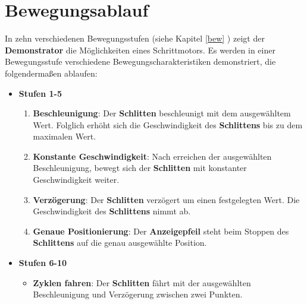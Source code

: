 
\chapter{Bewegungsablauf}

In zehn verschiedenen Bewegungsstufen (siehe Kapitel \ref{bew} ) zeigt der \textbf{Demonstrator} die Möglichkeiten eines Schrittmotors. Es werden in einer Bewegungsstufe verschiedene Bewegungscharakteristiken demonstriert, die folgendermaßen ablaufen:  

\begin{itemize}
	\item \textbf{Stufen 1-5}
	\begin{enumerate}
		\item\textbf{Beschleunigung}: Der \textbf{Schlitten} beschleunigt mit dem ausgewähltem Wert. Folglich erhöht sich die Geschwindigkeit des \textbf{Schlittens} bis zu dem maximalen Wert. 
		\item\textbf{Konstante Geschwindigkeit}: Nach erreichen der ausgewählten Beschleunigung, bewegt sich der \textbf{Schlitten} mit konstanter Geschwindigkeit weiter.
		\item\textbf{Verzögerung}: Der \textbf{Schlitten} verzögert um einen festgelegten Wert. Die Geschwindigkeit des \textbf{Schlittens} nimmt ab.
		\item\textbf{Genaue Positionierung}: Der \textbf{Anzeigepfeil} steht beim Stoppen des \textbf{Schlittens} auf die genau ausgewählte Position.
	\end{enumerate}
\end{itemize}
\begin{itemize}	
	\item \textbf{Stufen 6-10}
	\begin{itemize}
		\item\textbf{Zyklen fahren}: Der \textbf{Schlitten} fährt mit der ausgewählten Beschleunigung und Verzögerung zwischen zwei Punkten.
	\end{itemize}			
\end{itemize}